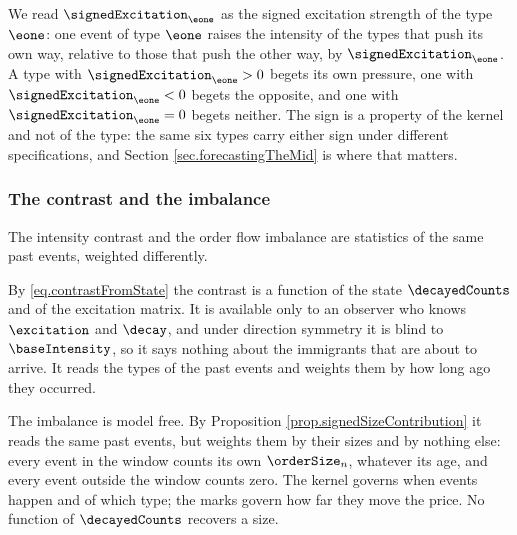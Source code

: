 We read $\signedExcitation_{\eone}$ as the signed excitation strength of the type $\eone$:
one event of type $\eone$ raises the intensity of the types that push its own way, relative
to those that push the other way, by $\signedExcitation_{\eone}$.
A type with $\signedExcitation_{\eone} > 0$ begets its own pressure,
one with $\signedExcitation_{\eone} < 0$ begets the opposite,
and one with $\signedExcitation_{\eone} = 0$ begets neither.
The sign is a property of the kernel and not of the type:
the same six types carry either sign under different specifications,
and Section \ref{sec.forecastingTheMid} is where that matters.

\subsubsection*{The contrast and the imbalance}

The intensity contrast and the order flow imbalance are statistics of the same past events,
weighted differently.

By \eqref{eq.contrastFromState} the contrast is a function of the state $\decayedCounts$ and
of the excitation matrix.
It is available only to an observer who knows $\excitation$ and $\decay$,
and under direction symmetry it is blind to $\baseIntensity$,
so it says nothing about the immigrants that are about to arrive.
It reads the types of the past events and weights them by how long ago they occurred.

The imbalance is model free.
By Proposition \ref{prop.signedSizeContribution} it reads the same past events,
but weights them by their sizes and by nothing else:
every event in the window counts its own $\orderSize_n$, whatever its age,
and every event outside the window counts zero.
The kernel governs when events happen and of which type;
the marks govern how far they move the price.
No function of $\decayedCounts$ recovers a size.
